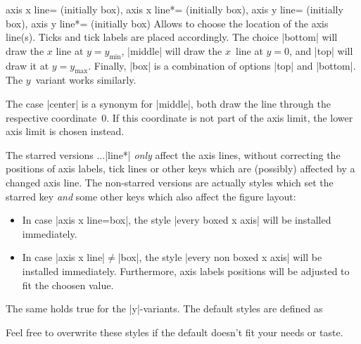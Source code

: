 \begin{pgfplotskeylist}{
	axis x line= (initially box),
	axis x line*= (initially box),
	axis y line= (initially box),
	axis y line*= (initially box)}
Allows to choose the location of the axis line(s). Ticks and tick labels are placed accordingly.
The choice |bottom| will draw the $x$ line at $y=y_\text{min}$, |middle| will draw the $x$~line at $y=0$, and |top| will draw it at $y=y_\text{max}$. Finally, |box| is a combination of options |top| and |bottom|. The $y$~variant works similarly.

The case |center| is a synonym for |middle|, both draw the line through the respective coordinate~$0$. If this coordinate is not part of the axis limit, the lower axis limit is chosen instead.

The starred versions $\dotsc$|line*| \emph{only} affect the axis lines, without correcting the positions of axis labels, tick lines or other keys which are (possibly) affected by a changed axis line. The non-starred versions are actually styles which set the starred key \emph{and} some other keys which also affect the figure layout:
\begin{itemize}
	\item In case |axis x line=box|, the style |every boxed x axis| will be installed immediately.
	\item In case |axis x line|$\neq$|box|, the style |every non boxed x axis| will be installed immediately. Furthermore, axis labels positions will be adjusted to fit the choosen value.
\end{itemize}
The same holds true for the |y|-variants. The default styles are defined as
\begin{codeexample}
\end{codeexample}
Feel free to overwrite these styles if the default doesn't fit your needs or taste. 

\begin{codeexample}[]
\end{codeexample}


\end{pgfplotskeylist}
